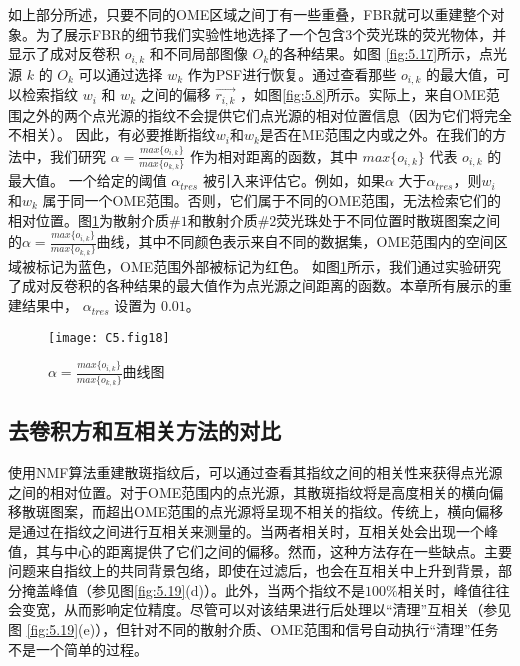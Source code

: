 如上部分所述，只要不同的OME区域之间丁有一些重叠，FBR就可以重建整个对象。为了展示FBR的细节我们实验性地选择了一个包含3个荧光珠的荧光物体，并显示了成对反卷积 $o_{i,k}$ 和不同局部图像 $O_{k}$的各种结果。如图 \ref{fig:5.17}所示，点光源 $k$ 的 $O_{k}$ 可以通过选择 $w_{k}$ 作为PSF进行恢复。通过查看那些 $o_{i,k}$ 的最大值，可以检索指纹 $w_{i}$ 和 $w_{k}$ 之间的偏移 $\vec{r_{i,k}}$ ，如图\ref{fig:5.8}所示。实际上，来自OME范围之外的两个点光源的指纹不会提供它们点光源的相对位置信息（因为它们将完全不相关）。
因此，有必要推断指纹$w_{i}$和$w_{k}$是否在ME范围之内或之外。在我们的方法中，我们研究 $\alpha= \frac {max\{o_{i,k}\}} {max\{o_{k,k}\}}$ 作为相对距离的函数，其中 $max \{ o_{i,k} \}$ 代表 $o_{i,k}$ 的最大值。
一个给定的阈值 $\alpha_{tres}$ 被引入来评估它。例如，如果$\alpha$ 大于$\alpha_{tres}$，则$w_{i}$ 和$w_{k}$ 属于同一个OME范围。否则，它们属于不同的OME范围，无法检索它们的相对位置。图\ref{fig:5.18}为散射介质$\# 1$和散射介质$\# 2$荧光珠处于不同位置时散斑图案之间的$\alpha= \frac {max\{o_{i,k}\}} {max\{o_{k,k}\}}$曲线，其中不同颜色表示来自不同的数据集，OME范围内的空间区域被标记为蓝色，OME范围外部被标记为红色。
如图\ref{fig:5.18}所示，我们通过实验研究了成对反卷积的各种结果的最大值作为点光源之间距离的函数。本章所有展示的重建结果中， $\alpha_{tres}$ 设置为 $0.01$。

\begin{figure}[htp]
	\centering
	\texttt{[image: C5.fig18]}
	\caption{$\alpha= \frac {max\{o_{i,k}\}} {max\{o_{k,k}\}}$曲线图}
	\label{fig:5.18}
\end{figure}

\subsection{去卷积方和互相关方法的对比}

使用NMF算法重建散斑指纹后，可以通过查看其指纹之间的相关性来获得点光源之间的相对位置。对于OME范围内的点光源，其散斑指纹将是高度相关的横向偏移散斑图案，而超出OME范围的点光源将呈现不相关的指纹。传统上，横向偏移是通过在指纹之间进行互相关来测量的。当两者相关时，互相关处会出现一个峰值，其与中心的距离提供了它们之间的偏移。然而，这种方法存在一些缺点。主要问题来自指纹上的共同背景包络，即使在过滤后，也会在互相关中上升到背景，部分掩盖峰值（参见图\ref{fig:5.19}(d)）。此外，当两个指纹不是$100 \%$相关时，峰值往往会变宽，从而影响定位精度。尽管可以对该结果进行后处理以“清理”互相关（参见图 \ref{fig:5.19}(e)），但针对不同的散射介质、OME范围和信号自动执行“清理”任务不是一个简单的过程。

